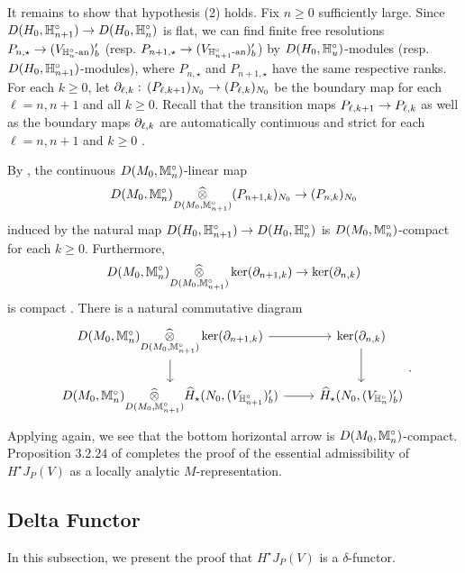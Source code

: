 \documentclass[10pt]{amsart}
\begin{document}
It remains to show that hypothesis (2) holds. Fix $n\geq 0$ sufficiently large. Since $D(H_{0},\mathbb{H}_{n+1}^{\circ})\rightarrow D(H_{0},\mathbb{H}_{n}^{\circ})$ is flat, we can find 
finite free resolutions $P_{n,\star}\rightarrow (V_{\mathbb{H}_{u}^{\circ}\textnormal{-an}})_{b}^{\prime}$ (resp. $P_{n+1,\star}\rightarrow (V_{\mathbb{H}_{n+1}^{\circ}\textnormal{-an}})_{b}^{\prime}$) by $D(H_{0},\mathbb{H}_{u}^{\circ})$-modules (resp. $D(H_{0},\mathbb{H}_{n+1}^{\circ})$-modules), where $P_{n,\star}$ and $P_{n+1,\star}$ have the same respective ranks. For each $k\geq0$, let $\partial_{\ell,k}:\,(P_{\ell,k+1})_{N_{0}}\rightarrow (P_{\ell,k})_{N_{0}}$ be the boundary map for each $\ell=n,n+1$ and all $k\geq 0$. Recall that the transition maps $P_{\ell,k+1}\rightarrow P_{\ell,k}$ as well as the boundary maps $\partial_{\ell,k}$ are automatically continuous and strict for each $\ell=n,n+1$ and $k\geq 0$ \cite[Prop. A.10]{Jacquet2}. 

By \cite[Prop. 4.2.22]{Jacquet1}, the continuous $D(M_{0},\mathbb{M}_{n}^{\circ})$-linear map \[
    D(M_{0},\mathbb{M}_{n}^{\circ})\underset{D(M_{0},\mathbb{M}_{n+1}^{\circ})}{\widehat{\otimes}}(P_{n+1,k})_{N_{0}} \rightarrow (P_{n,k})_{N_{0}}
\] induced by the natural map $D(H_{0},\mathbb{H}_{n+1}^{\circ})\rightarrow D(H_{0},\mathbb{H}_{n}^{\circ})$ is $D(M_{0},\mathbb{M}_{n}^{\circ})$-compact for each $k\geq 0$. Furthermore, \[
    D(M_{0},\mathbb{M}_{n}^{\circ})\underset{D(M_{0},\mathbb{M}_{n+1}^{\circ})}{\widehat{\otimes}}\ker(\partial_{n+1,k}) \rightarrow \ker(\partial_{n,k})
\] is compact \cite[Lem. 2.3.4]{Jacquet1}. There is a natural commutative diagram \begin{equation}
    \begin{tikzcd}
	D(M_{0},\m_{n}^{\circ})\underset{D(M_{0},\m_{n+1}^{\circ})}{\widehat{\otimes}}\ker(\d_{n+1,k}) \arrow[r] \arrow[d] &  \ker(\d_{n,k}) \arrow[d] \\
	D(M_{0},\m_{n}^{\circ})\underset{D(M_{0},\m_{n+1}^{\circ})}{\widehat{\otimes}} \widehat{H}_{\star}(N_{0},(V_{\h_{n+1}^{\circ}})_{b}^{\prime})\arrow[r] & \widehat{H}_{\star}(N_{0},(V_{\h_{n}^{\circ}})_{b}^{\prime})
\end{tikzcd}.
\end{equation} Applying \cite[Lem. 2.3.4]{Jacquet1} again, we see that the bottom horizontal arrow is $D(M_{0},\mathbb{M}_{n}^{\circ})$-compact. Proposition $3.2.24$ of \cite{Jacquet1} completes the proof of the essential admissibility of $H^{\star}J_{P}(V)$ as a locally analytic $M$-representation.


\subsection{Delta Functor}\label{sec:delta}
In this subsection, we present the proof that $H^{\star}J_{P}(V)$ is a $\delta$-functor.
\end{document}
